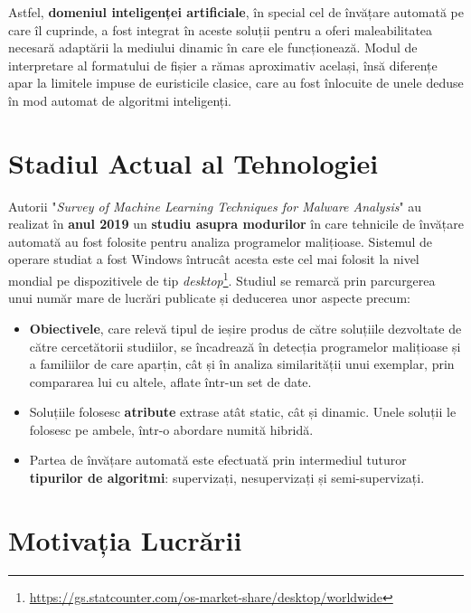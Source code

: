 \documentclass[../../main.tex]{subfiles}
\begin{document}
Astfel, \textbf{domeniul inteligenței artificiale}, în special cel de învățare a\-utomată pe care îl cuprinde, a fost integrat în aceste soluții pentru a oferi maleabilitatea necesară adaptării la mediului dinamic în care ele funcționează. Modul de interpretare al formatului de fișier a rămas aproximativ același, însă diferențe apar la limitele impuse de euristicile clasice, care au fost înlocuite de unele deduse în mod automat de algoritmi inteligenți.

\section{Stadiul Actual al Tehnologiei}
\label{sec:introduction_sota}

Autorii "\textit{Survey of Machine Learning Techniques for Malware Analysis}" \cite{ml_malware_survey} au realizat în \textbf{anul 2019} un \textbf{studiu asupra modurilor} în care tehnicile de învățare automată au fost folosite pentru analiza programelor malițioase. Sistemul de operare studiat a fost Windows întrucât acesta este cel mai folosit la nivel mondial pe dispozitivele de tip \textit{desktop}\footnote{\href{https://gs.statcounter.com/os-market-share/desktop/worldwide}{https://gs.statcounter.com/os-market-share/desktop/worldwide}}. Studiul se remarcă prin parcur\-gerea unui număr mare de lucrări publicate și deducerea unor aspecte precum:

\begin{itemize}
    \item \textbf{Obiectivele}, care relevă tipul de ieșire produs de către soluțiile dezvoltate de către cercetătorii studiilor, se încadrează în detecția programelor maliți\-oase și a familiilor de care aparțin, cât și în analiza similarității unui exemplar, prin compararea lui cu altele, aflate într-un set de date.
    \item Soluțiile folosesc \textbf{atribute} extrase atât static, cât și dinamic. Unele soluții le folosesc pe ambele, într-o abordare numită hibridă.
    \item Partea de învățare automată este efectuată prin intermediul tuturor \textbf{tipu\-rilor de algoritmi}: supervizați, nesupervizați și semi-supervizați.
\end{itemize}

\section{Motivația Lucrării}
\label{sec:introduction_motivation}
\end{document}
